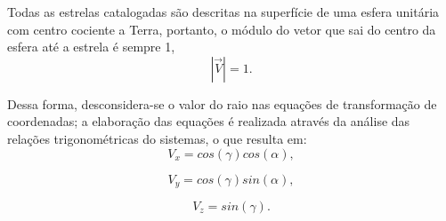 Todas as estrelas catalogadas são descritas na superfície de uma esfera unitária  com centro cociente a Terra, 
portanto, o módulo do vetor que sai do centro da esfera até a estrela é sempre 1,
\begin{equation}
	\left| \overrightarrow{V}\right|=1.
	\label{eq:1}
\end{equation}

Dessa forma, desconsidera-se o valor do raio nas equações de transformação de coordenadas; 
a elaboração das equações é realizada através da análise das relações trigonométricas do sistemas, 
o que resulta em:
\begin{equation}
	V_{x}=cos(\gamma)cos(\alpha),
	\label{eq:2}
\end{equation}

\begin{equation}
	V_{y}=cos(\gamma)sin(\alpha),
	\label{eq:3}
\end{equation}

\begin{equation}
	V_{z}=sin(\gamma).
	\label{eq:4}
\end{equation}
